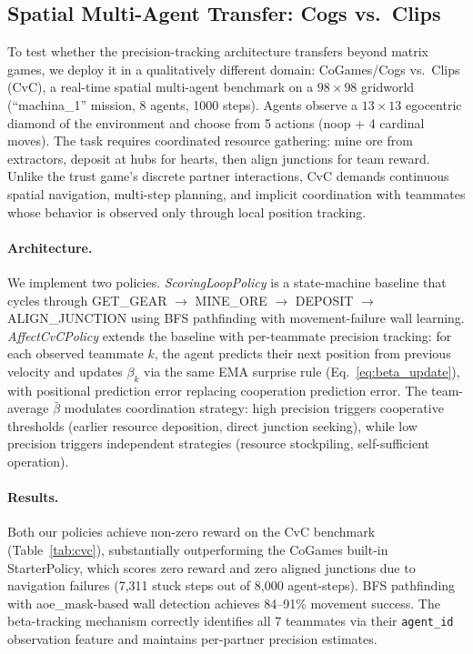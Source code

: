 \documentclass[11pt,a4paper]{article}
\begin{document}
\subsection{Spatial Multi-Agent Transfer: Cogs vs.\ Clips}
\label{sec:cvc}

To test whether the precision-tracking architecture transfers beyond matrix games, we deploy it in a qualitatively different domain: CoGames/Cogs vs.\ Clips (CvC), a real-time spatial multi-agent benchmark on a $98 \times 98$ gridworld (``machina\_1'' mission, 8 agents, 1000 steps). Agents observe a $13 \times 13$ egocentric diamond of the environment and choose from 5 actions (noop + 4 cardinal moves). The task requires coordinated resource gathering: mine ore from extractors, deposit at hubs for hearts, then align junctions for team reward. Unlike the trust game's discrete partner interactions, CvC demands continuous spatial navigation, multi-step planning, and implicit coordination with teammates whose behavior is observed only through local position tracking.

\paragraph{Architecture.} We implement two policies. \emph{ScoringLoopPolicy} is a state-machine baseline that cycles through GET\_GEAR $\to$ MINE\_ORE $\to$ DEPOSIT $\to$ ALIGN\_JUNCTION using BFS pathfinding with movement-failure wall learning. \emph{AffectCvCPolicy} extends the baseline with per-teammate precision tracking: for each observed teammate $k$, the agent predicts their next position from previous velocity and updates $\beta_k$ via the same EMA surprise rule (Eq.~\ref{eq:beta_update}), with positional prediction error replacing cooperation prediction error. The team-average $\bar{\beta}$ modulates coordination strategy: high precision triggers cooperative thresholds (earlier resource deposition, direct junction seeking), while low precision triggers independent strategies (resource stockpiling, self-sufficient operation).

\paragraph{Results.} Both our policies achieve non-zero reward on the CvC benchmark (Table~\ref{tab:cvc}), substantially outperforming the CoGames built-in StarterPolicy, which scores zero reward and zero aligned junctions due to navigation failures (7,311 stuck steps out of 8,000 agent-steps). BFS pathfinding with aoe\_mask-based wall detection achieves 84--91\% movement success. The beta-tracking mechanism correctly identifies all 7 teammates via their \texttt{agent\_id} observation feature and maintains per-partner precision estimates.
\end{document}
